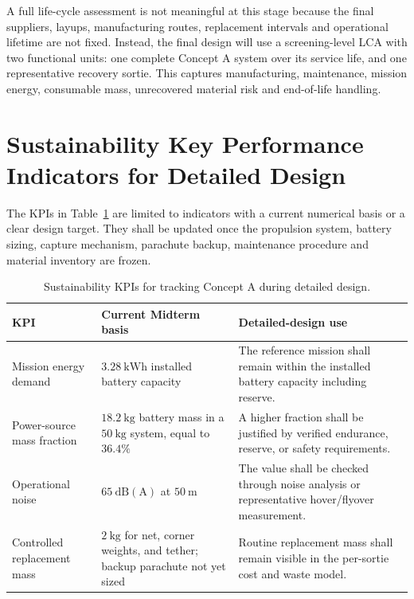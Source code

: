 A full life-cycle assessment is not meaningful at this stage because the final suppliers, layups, manufacturing routes, replacement intervals and operational lifetime are not fixed. Instead, the final design will use a screening-level LCA with two functional units: one complete Concept A system over its service life, and one representative recovery sortie. This captures manufacturing, maintenance, mission energy, consumable mass, unrecovered material risk and end-of-life handling.

\section{Sustainability Key Performance Indicators for Detailed Design}
\label{sec:sustainability_kpis_detailed_design}

The KPIs in Table~\ref{tab:sustainability_kpis_concept_a} are limited to indicators with a current numerical basis or a clear design target. They shall be updated once the propulsion system, battery sizing, capture mechanism, parachute backup, maintenance procedure and material inventory are frozen.

\begin{table}[H]
\centering
\footnotesize
\caption{Sustainability KPIs for tracking Concept A during detailed design.}
\label{tab:sustainability_kpis_concept_a}
\renewcommand{\arraystretch}{1.2}
\setlength{\tabcolsep}{4pt}
\begin{tabularx}{\textwidth}{@{}p{}p{}X@{}}
\toprule
\textbf{KPI} & \textbf{Current Midterm basis} & \textbf{Detailed-design use} \\
\midrule
Mission energy demand
& \(3.28~\mathrm{kWh}\) installed battery capacity
& The reference mission shall remain within the installed battery capacity including reserve. \\

Power-source mass fraction
& \(18.2~\mathrm{kg}\) battery mass in a \(50~\mathrm{kg}\) system, equal to \(36.4\%\)
& A higher fraction shall be justified by verified endurance, reserve, or safety requirements. \\



Operational noise
& \(65~\mathrm{dB(A)}\) at \(50~\mathrm{m}\)
& The value shall be checked through noise analysis or representative hover/flyover measurement. \\

Controlled replacement mass
& \(2~\mathrm{kg}\) for net, corner weights, and tether; backup parachute not yet sized
& Routine replacement mass shall remain visible in the per-sortie cost and waste model. \\





\bottomrule
\end{tabularx}
\end{table}

